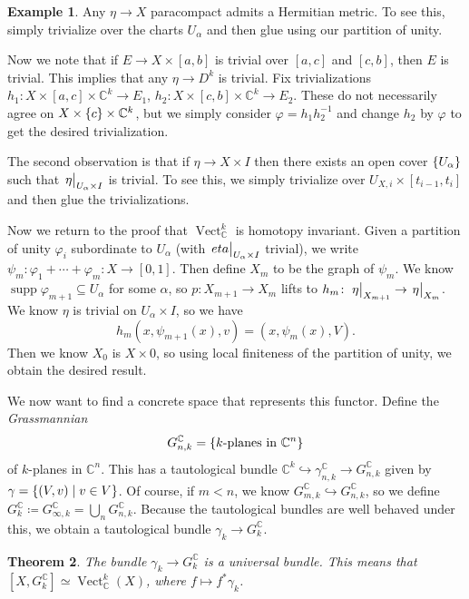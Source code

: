 \documentclass[leqno, openany]{memoir}
\newtheorem{thm}{Theorem}[section]
\theoremstyle{definition}
\newtheorem{exm}[thm]{Example}
\theoremstyle{remark}
\theoremstyle{plain}
\theoremstyle{definition}
\theoremstyle{remark}
\newcommand{\C}{\mathbb{C}}
\DeclareMathOperator{\Vect}{Vect}
\begin{document}
\begin{exm} Any $\eta \to X$ paracompact admits a Hermitian metric. To see
this, simply trivialize over the charts $U_{\alpha}$ and then glue using our
partition of unity.  \end{exm}

Now we note that if $E \to X \times [a,b]$ is trivial over $[a,c]$ and $[c,b]$,
then $E$ is trivial. This implies that any $\eta \to D^k$ is trivial. Fix
trivializations $h_1 \colon X \times [a,c] \times \C^k \to E_1$, $h_2 \colon X
\times [c,b] \times \C^k \to E_2$. These do not necessarily agree on $X \times
\qty{c} \times \C^k$, but we simply consider $\varphi = h_1 h_2^{-1}$ and
change $h_2$ by $\varphi$ to get the desired trivialization.

The second observation is that if $\eta \to X \times I$ then there exists an
open cover $\qty{U_{\alpha}}$ such that $\eval{\eta}_{U_{\alpha} \times I}$ is
trivial. To see this, we simply trivialize over $U_{X,i} \times [t_{i-1}, t_i]$
and then glue the trivializations.

Now we return to the proof that $\Vect_{\C}^k$ is homotopy invariant. Given a
partition of unity $\varphi_i$ subordinate to $U_{\alpha}$ (with
$\eval{eta}_{U_{\alpha} \times I}$ trivial), we write $\psi_m \colon \varphi_1
+ \cdots + \varphi_m \colon X \to [0,1]$. Then define $X_m$ to be the graph of
$\psi_m$. We know $\operatorname{supp} \varphi_{m+1} \subseteq U_{\alpha}$ for
some $\alpha$, so $p \colon X_{m+1} \to X_m$ lifts to $h_m \colon
\eval{\eta}_{X_{m+1}} \to \eval{\eta}_{X_m}$. We know $\eta$ is trivial on
$U_{\alpha} \times I$, so we have \[ h_m(x, \psi_{m+1}(x), v) = (x, \psi_m(x),
V). \] Then we know $X_0$ is $X \times \qty{0}$, so using local finiteness of
the partition of unity, we obtain the desired result.

We now want to find a concrete space that represents this functor. Define the
\textit{Grassmannian} \[ G_{n, k}^{\C} = \qty{k\text{-planes in }\C^n} \] of
$k$-planes in $\C^n$. This has a tautological bundle $\C^k \hookrightarrow
\gamma_{n, k}^{\C} \to G_{n,k}^{\C}$ given by $\gamma = \qty{(V, v) \mid v \in
V}$. Of course, if $m < n$, we know $G_{m,k}^{\C} \hookrightarrow
G_{n,k}^{\C}$, so we define $G_k^{\C} \coloneqq G_{\infty,k}^{\C} = \bigcup_n
G_{n,k}^{\C}$. Because the tautological bundles are well behaved under this, we
obtain a tautological bundle $\gamma_k \to G_k^{\C}$.

\begin{thm} The bundle $\gamma_k \to G_k^{\C}$ is a universal bundle. This
means that $[X, G_k^{\C}] \simeq \Vect_{\C}^k(X)$, where $f \mapsto f^*
\gamma_k$.  \end{thm}
\end{document}
